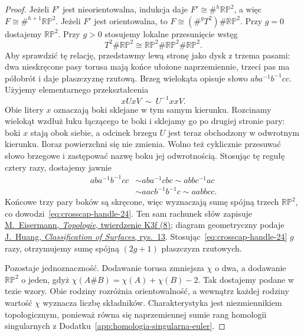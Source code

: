 \begin{proof}
Jeżeli $F'$ jest nieorientowalna, indukcja
daje $F'\cong\#^h\mathbb{RP}^2$, a więc
$F\cong\#^{h+1}\mathbb{RP}^2$.
Jeżeli $F'$ jest orientowalna, to
$F\cong(\#^gT^2)\#\mathbb{RP}^2$.
Przy $g=0$ dostajemy $\mathbb{RP}^2$.
Przy $g>0$ stosujemy lokalne przesunięcie
wstęg
\begin{equation}\label{eq:crosscap-handle-24}
 T^2\#\mathbb{RP}^2
 \cong\mathbb{RP}^2\#\mathbb{RP}^2
       \#\mathbb{RP}^2.
\end{equation}
Aby sprawdzić tę relację, przedstawmy
lewą stronę jako dysk z trzema pasami:
dwa nieskręcone pasy torusa mają końce
ułożone naprzemiennie, trzeci pas ma
półobrót i daje płaszczyznę rzutową.
Brzeg wielokąta opisuje słowo
$aba^{-1}b^{-1}cc$. Użyjemy elementarnego
przekształcenia
\[
 xUxV\ \sim\ U^{-1}xxV.
\]
Obie litery $x$ oznaczają boki sklejane
w tym samym kierunku. Rozcinamy wielokąt
wzdłuż łuku łączącego te boki i sklejamy
go po drugiej stronie pary: boki $x$
stają obok siebie, a odcinek brzegu $U$
jest teraz obchodzony w odwrotnym kierunku.
Iloraz powierzchni się nie zmienia.
Wolno też cyklicznie przesuwać słowo
brzegowe i zastępować nazwę boku
jej odwrotnością. Stosując tę regułę
cztery razy, dostajemy jawnie
\[
\begin{aligned}
 aba^{-1}b^{-1}cc
 &\sim aba^{-1}cbc
  \sim abbc^{-1}ac\\
 &\sim aacb^{-1}b^{-1}c
  \sim aabbcc.
\end{aligned}
\]
Końcowe trzy pary boków są skręcone,
więc wyznaczają sumę spójną trzech
$\mathbb{RP}^2$, co dowodzi~\eqref{eq:crosscap-handle-24}.
Ten sam rachunek słów zapisuje
\href{https://pnp.mathematik.uni-stuttgart.de/igt/eiserm/lehre/Topologie/Topologie-K-2x2.pdf}
{M.\ Eisermann, \emph{Topologie}, twierdzenie K3f (8)};
diagram geometryczny podaje
\href{https://www.math.uchicago.edu/~may/VIGRE/VIGRE2008/REUPapers/Huang.pdf}
{J.\ Huang, \emph{Classification of Surfaces}, rys.~13}.
Stosując~\eqref{eq:crosscap-handle-24}
$g$ razy, otrzymujemy sumę spójną
$(2g+1)$ płaszczyzn rzutowych.

Pozostaje jednoznaczność. Dodawanie torusa
zmniejsza $\chi$ o dwa, a dodawanie
$\mathbb{RP}^2$ o jeden, gdyż
$\chi(A\#B)=\chi(A)+\chi(B)-2$.
Tak dostajemy podane w tezie wzory.
Obie rodziny rozróżnia orientowalność,
a wewnątrz każdej rodziny wartość $\chi$
wyznacza liczbę składników. Charakterystyka
jest niezmiennikiem topologicznym, ponieważ
równa się naprzemiennej sumie rang homologii
singularnych z Dodatku~\ref{app:homologia-singularna-euler}.
\end{proof}

